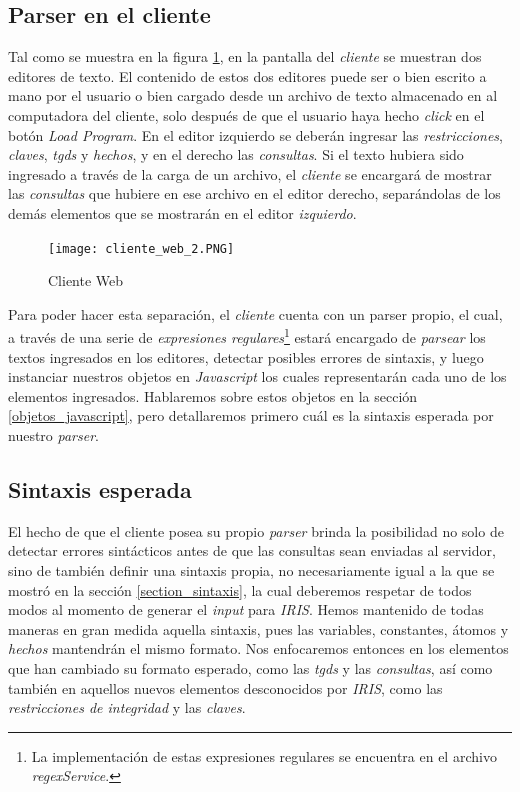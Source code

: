 \documentclass[11pt,a4paper,twoside]{tesis}
\begin{document}
\subsection{Parser en el cliente}

Tal como se muestra en la figura \ref{fig:cliente_web_2}, en la pantalla del \textit{cliente} se muestran dos editores de texto. El contenido de estos dos editores puede ser o bien escrito a mano por el usuario o bien cargado desde un archivo de texto almacenado en al computadora del cliente, solo después de que el usuario haya hecho \textit{click} en el botón \textit{Load Program}. En el editor izquierdo se deberán ingresar las \textit{restricciones}, \textit{claves}, \textit{tgds} y \textit{hechos}, y en el derecho las \textit{consultas}. Si el texto hubiera sido ingresado a través de la carga de un archivo, el \textit{cliente} se encargará de mostrar las \textit{consultas} que hubiere en ese archivo en el editor derecho, separándolas de los demás elementos que se mostrarán en el editor \textit{izquierdo}. 

\begin{figure}[ht]
    \texttt{[image: cliente\_web\_2.PNG]}
    \centering
    \caption{Cliente Web}
    \label{fig:cliente_web_2}
\end{figure}

 
Para poder hacer esta separación, el \textit{cliente} cuenta con un parser propio, el cual, a través de una serie de \textit{expresiones regulares}\footnote{La implementación de estas expresiones regulares se encuentra en el archivo \textit{regexService}.}  estará encargado de \textit{parsear} los textos ingresados en los editores, detectar posibles errores de sintaxis, y luego instanciar nuestros objetos en \textit{Javascript} los cuales representarán cada uno de los elementos ingresados. Hablaremos sobre estos objetos en la sección \ref{objetos_javascript}, pero detallaremos primero cuál es la sintaxis esperada por nuestro \textit{parser}.

\subsection{Sintaxis esperada}

El hecho de que el cliente posea su propio \textit{parser} brinda la posibilidad no solo de detectar errores sintácticos antes de que las consultas sean enviadas al servidor, sino de también definir una sintaxis propia, no necesariamente igual a la que se mostró en la sección \ref{section_sintaxis}, la cual deberemos respetar de todos modos al momento de generar el \textit{input} para \textit{IRIS}. Hemos mantenido de todas maneras en gran medida aquella sintaxis, pues las variables, constantes, átomos y \textit{hechos} mantendrán el mismo formato. Nos enfocaremos entonces en los elementos que han cambiado su formato esperado, como las \textit{tgds} y las \textit{consultas}, así como también en aquellos nuevos elementos desconocidos por \textit{IRIS}, como las \textit{restricciones de integridad} y las \textit{claves}.
\end{document}
